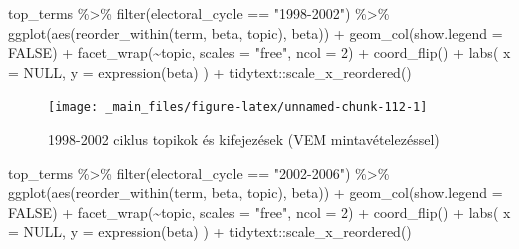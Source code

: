\documentclass[
]{book}
\newenvironment{Shaded}{\begin{snugshade}}{\end{snugshade}}
\newcommand{\AttributeTok}[1]{\textcolor[rgb]{0.77,0.63,0.00}{#1}}
\newcommand{\ConstantTok}[1]{\textcolor[rgb]{0.00,0.00,0.00}{#1}}
\newcommand{\DecValTok}[1]{\textcolor[rgb]{0.00,0.00,0.81}{#1}}
\newcommand{\FunctionTok}[1]{\textcolor[rgb]{0.00,0.00,0.00}{#1}}
\newcommand{\NormalTok}[1]{#1}
\newcommand{\SpecialCharTok}[1]{\textcolor[rgb]{0.00,0.00,0.00}{#1}}
\newcommand{\StringTok}[1]{\textcolor[rgb]{0.31,0.60,0.02}{#1}}
\begin{document}
\begin{Shaded}
\begin{Highlighting}[]
\NormalTok{top\_terms }\SpecialCharTok{\%\textgreater{}\%}
  \FunctionTok{filter}\NormalTok{(electoral\_cycle }\SpecialCharTok{==} \StringTok{"1998{-}2002"}\NormalTok{) }\SpecialCharTok{\%\textgreater{}\%}
  \FunctionTok{ggplot}\NormalTok{(}\FunctionTok{aes}\NormalTok{(}\FunctionTok{reorder\_within}\NormalTok{(term, beta, topic), beta)) }\SpecialCharTok{+}
  \FunctionTok{geom\_col}\NormalTok{(}\AttributeTok{show.legend =} \ConstantTok{FALSE}\NormalTok{) }\SpecialCharTok{+}
  \FunctionTok{facet\_wrap}\NormalTok{(}\SpecialCharTok{\textasciitilde{}}\NormalTok{topic, }\AttributeTok{scales =} \StringTok{"free"}\NormalTok{, }\AttributeTok{ncol =} \DecValTok{2}\NormalTok{) }\SpecialCharTok{+}
  \FunctionTok{coord\_flip}\NormalTok{() }\SpecialCharTok{+}
  \FunctionTok{labs}\NormalTok{(}
    \AttributeTok{x =} \ConstantTok{NULL}\NormalTok{,}
    \AttributeTok{y =} \FunctionTok{expression}\NormalTok{(beta)}
\NormalTok{  ) }\SpecialCharTok{+}
\NormalTok{  tidytext}\SpecialCharTok{::}\FunctionTok{scale\_x\_reordered}\NormalTok{()}
\end{Highlighting}
\end{Shaded}

\begin{figure}

{\centering \texttt{[image: \_main\_files/figure-latex/unnamed-chunk-112-1]} 

}

\caption{1998-2002 ciklus topikok és kifejezések (VEM mintavételezéssel)}\label{fig:unnamed-chunk-112}
\end{figure}

\begin{Shaded}
\begin{Highlighting}[]
\NormalTok{top\_terms }\SpecialCharTok{\%\textgreater{}\%}
  \FunctionTok{filter}\NormalTok{(electoral\_cycle }\SpecialCharTok{==} \StringTok{"2002{-}2006"}\NormalTok{) }\SpecialCharTok{\%\textgreater{}\%}
  \FunctionTok{ggplot}\NormalTok{(}\FunctionTok{aes}\NormalTok{(}\FunctionTok{reorder\_within}\NormalTok{(term, beta, topic), beta)) }\SpecialCharTok{+}
  \FunctionTok{geom\_col}\NormalTok{(}\AttributeTok{show.legend =} \ConstantTok{FALSE}\NormalTok{) }\SpecialCharTok{+}
  \FunctionTok{facet\_wrap}\NormalTok{(}\SpecialCharTok{\textasciitilde{}}\NormalTok{topic, }\AttributeTok{scales =} \StringTok{"free"}\NormalTok{, }\AttributeTok{ncol =} \DecValTok{2}\NormalTok{) }\SpecialCharTok{+}
  \FunctionTok{coord\_flip}\NormalTok{() }\SpecialCharTok{+}
  \FunctionTok{labs}\NormalTok{(}
    \AttributeTok{x =} \ConstantTok{NULL}\NormalTok{,}
    \AttributeTok{y =} \FunctionTok{expression}\NormalTok{(beta)}
\NormalTok{  ) }\SpecialCharTok{+}
\NormalTok{  tidytext}\SpecialCharTok{::}\FunctionTok{scale\_x\_reordered}\NormalTok{()}
\end{Highlighting}
\end{Shaded}
\end{document}
